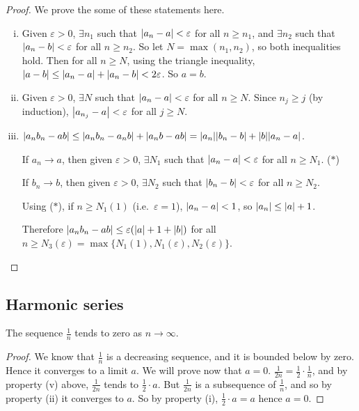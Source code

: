 \begin{proof}
	We prove the some of these statements here.
	\begin{enumerate}[(i)]
		\item Given \(\varepsilon > 0\), \(\exists n_1\) such that \(\abs{a_n - a} < \varepsilon\) for all \(n \geq n_1\), and \(\exists n_2\) such that \(\abs{a_n - b} < \varepsilon\) for all \(n \geq n_2\).
		      So let \(N = \max(n_1, n_2)\), so both inequalities hold.
		      Then for all \(n \geq N\), using the triangle inequality, \(\abs{a - b} \leq \abs{a_n - a} + \abs{a_n - b} < 2\varepsilon\).
		      So \(a=b\).
		\item Given \(\varepsilon > 0\), \(\exists N\) such that \(\abs{a_n - a} < \varepsilon\) for all \(n \geq N\).
		      Since \(n_j \geq j\) (by induction), \(\abs{a_{n_j} - a} < \varepsilon\) for all \(j \geq N\).
		      \setcounter{enumi}{4}
		\item \(\abs{a_n b_n - ab} \leq \abs{a_n b_n - a_n b} + \abs{a_n b - ab} = \abs{a_n}\abs{b_n - b} + \abs{b}\abs{a_n - a}\).

		      If \(a_n \to a\), then given \(\varepsilon > 0\), \(\exists N_1\) such that \(\abs{a_n - a} < \varepsilon\) for all \(n \geq N_1\).
		      (\(\ast\))

		      If \(b_n \to b\), then given \(\varepsilon > 0\), \(\exists N_2\) such that \(\abs{b_n - b} < \varepsilon\) for all \(n \geq N_2\).

		      Using (\(\ast\)), if \(n \geq N_1(1)\) (i.e.\ \(\varepsilon = 1\)), \(\abs{a_n - a} < 1\), so \(\abs{a_n} \leq \abs{a} + 1\).

		      Therefore \(\abs{a_n b_n - ab} \leq \varepsilon(\abs{a} + 1 + \abs{b})\) for all \(n \geq N_3(\varepsilon) = \max\{ N_1(1), N_1(\varepsilon), N_2(\varepsilon) \}\).
	\end{enumerate}
\end{proof}

\subsection{Harmonic series}
\begin{lemma}
	The sequence \(\frac{1}{n}\) tends to zero as \(n \to \infty\).
\end{lemma}
\begin{proof}
	We know that \(\frac{1}{n}\) is a decreasing sequence, and it is bounded below by zero.
	Hence it converges to a limit \(a\).
	We will prove now that \(a = 0\).
	\(\frac{1}{2n} = \frac{1}{2}\cdot \frac{1}{n}\), and by property (v) above, \(\frac{1}{2n}\) tends to \(\frac{1}{2}\cdot a\).
	But \(\frac{1}{2n}\) is a subsequence of \(\frac{1}{n}\), and so by property (ii) it converges to \(a\).
	So by property (i), \(\frac{1}{2} \cdot a = a\) hence \(a=0\).
\end{proof}

